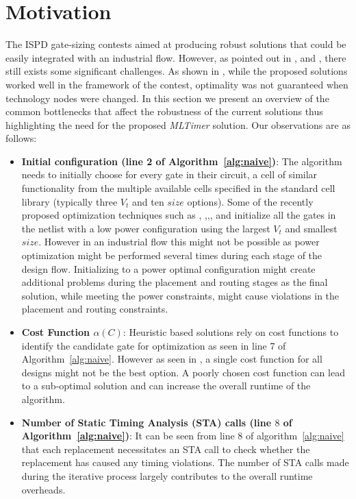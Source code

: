 
\section{Motivation}
\label{sec:motivation}
 The ISPD gate-sizing contests aimed at producing robust solutions that could be easily integrated with an industrial flow. However, as pointed out in \cite{reis:16}, \cite{kahng:16} and \cite{kahng:14}, there still exists some significant challenges. As shown in \cite{kahng:14}, while the proposed solutions worked well in the framework of the contest, optimality was not guaranteed when technology nodes were changed. In this section we present an overview of the common bottlenecks that affect the robustness of the current solutions thus highlighting the need for the proposed \textit{MLTimer} solution. Our observations are as follows: 
\begin{itemize}
    \item \textbf{Initial configuration (line 2 of Algorithm~\ref{alg:naive})}: The algorithm needs to initially choose for every gate in their circuit, a cell of similar functionality from the multiple available cells specified in the standard cell library (typically three $V_t$ and ten $size$ options). Some of the recently proposed optimization techniques such as \cite{ozdal:12}, \cite{hu:12},\cite{li:12},\cite{flach:13}, and \cite{livramento:13} initialize all the gates in the netlist with a low power configuration using the largest $V_t$ and smallest $size$. However in an industrial flow this might not be possible as power optimization might be performed several times during each stage of the design flow. Initializing to a power optimal configuration  might create additional problems during the placement and routing stages as the final solution, while meeting the power constraints, might cause violations in the placement and routing constraints.    
  
    \item \textbf{Cost Function $\alpha(C)$}: Heuristic based solutions rely on cost functions to identify the candidate gate for optimization as seen in line 7 of Algorithm~\ref{alg:naive}.  However as seen in \cite{hu:12}, a single cost function for all designs might not be the best option. A poorly chosen cost function can lead to a sub-optimal solution and can increase the overall runtime of the algorithm. %
    \item \textbf{Number of Static Timing Analysis (STA) calls (line $8$ of Algorithm~\ref{alg:naive})}: It can be seen from line $8$ of algorithm~\ref{alg:naive} that each replacement  necessitates an STA call to check whether the replacement has caused any timing violations. The number of STA calls made during the iterative process largely contributes to the overall runtime overheads. 

\end{itemize}

